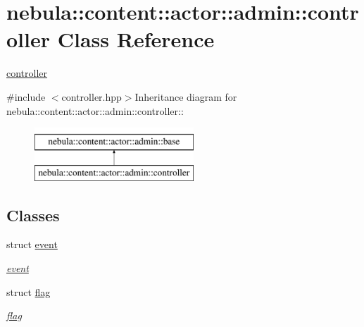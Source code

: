\hypertarget{classnebula_1_1content_1_1actor_1_1admin_1_1controller}{
\section{nebula::content::actor::admin::controller Class Reference}
\label{classnebula_1_1content_1_1actor_1_1admin_1_1controller}
}


\hyperlink{classnebula_1_1content_1_1actor_1_1admin_1_1controller}{controller}  


{\ttfamily \#include $<$controller.hpp$>$}Inheritance diagram for nebula::content::actor::admin::controller::\begin{figure}[H]
\begin{center}
\leavevmode
\includegraphics[height=2cm]{classnebula_1_1content_1_1actor_1_1admin_1_1controller}
\end{center}
\end{figure}
\subsection*{Classes}
\begin{DoxyCompactItemize}
\item 
struct \hyperlink{structnebula_1_1content_1_1actor_1_1admin_1_1controller_1_1event}{event}
\begin{DoxyCompactList}\small\item\em \hyperlink{structnebula_1_1content_1_1actor_1_1admin_1_1controller_1_1event}{event} \item\end{DoxyCompactList}\item 
struct \hyperlink{structnebula_1_1content_1_1actor_1_1admin_1_1controller_1_1flag}{flag}
\begin{DoxyCompactList}\small\item\em \hyperlink{structnebula_1_1content_1_1actor_1_1admin_1_1controller_1_1flag}{flag} \item\end{DoxyCompactList}\end{DoxyCompactItemize}
